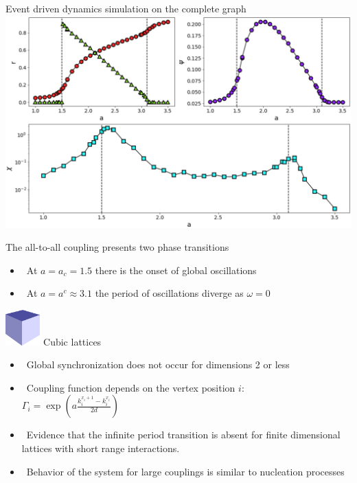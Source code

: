\documentclass[serif,mathserif]{beamer}
\begin{document}
\begin{frame}
    \centering
    Event driven dynamics simulation on the complete graph\\
    \vspace{0.8cm}
    \includegraphics[width=\textwidth]{./complete_graph.eps}
\end{frame}

\begin{frame}
    The all-to-all coupling presents two phase transitions
    \begin{itemize}
        \vspace{0.35cm}
        \item \ \pause At $a=a_c=1.5$ there is the onset of global oscillations
        \vspace{0.35cm}
        \item \ \pause At $a=a^c\approx 3.1$ the period of oscillations diverge as $\omega=0$
    \end{itemize}
\end{frame}

\begin{frame}
    \includegraphics[width=0.1\textwidth]{./cube.eps}\hspace{0.5cm}
    Cubic lattices
    \begin{itemize}
        \vspace{0.25cm}
        \item \ \pause Global synchronization does not occur for dimensions 2 or less
        \vspace{0.25cm}
        \item \ \pause Coupling function depends on the vertex position $i$:\\
            $\Gamma_i = \exp \left( a\frac{k_i^{x_i+1} - k_i^{x_i}}{2d} \right)$
        \vspace{0.25cm}
        \item \ \pause Evidence that the infinite period transition is absent for finite dimensional lattices with short range interactions.
        \vspace{0.25cm}
        \item \ \pause Behavior of the system for large couplings is similar to nucleation processes
    \end{itemize}
\end{frame}
\end{document}
